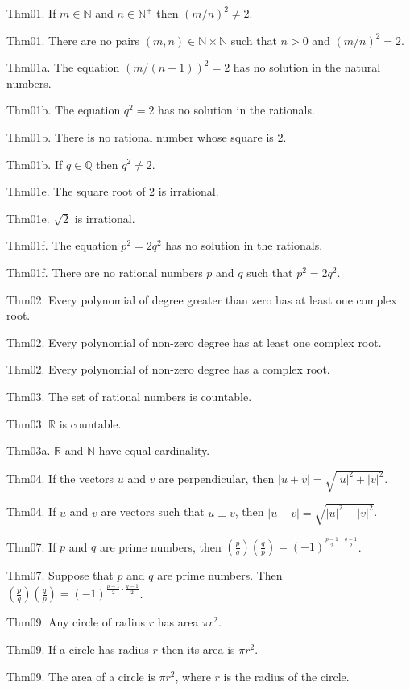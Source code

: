 \documentclass{report}
\begin{document}
Thm01. If $m \in \mathbb{N}$ and $n \in \mathbb{N}^+$ then $(m/n)^2 \neq 2$.

Thm01. There are no pairs $(m, n) \in \mathbb{N}\times\mathbb{N}$ such that $n > 0$ and $(m/n)^2 = 2$.

Thm01a. The equation $(m/(n+1))^2 = 2$ has no solution in the natural numbers.

Thm01b. The equation $q^2 = 2$ has no solution in the rationals.

Thm01b. There is no rational number whose square is $2$.

Thm01b. If $q \in \mathbb{Q}$ then $q^2 \neq 2$.

Thm01e. The square root of $2$ is irrational.

Thm01e. $\sqrt{2}$ is irrational.

Thm01f. The equation $p^2 = 2q^2$ has no solution in the rationals.

Thm01f. There are no rational numbers $p$ and $q$ such that $p^2 = 2q^2$.

Thm02. Every polynomial of degree greater than zero has at least one complex root.

Thm02. Every polynomial of non-zero degree has at least one complex root.

Thm02. Every polynomial of non-zero degree has a complex root.

Thm03. The set of rational numbers is countable.

Thm03. $\mathbb{R}$ is countable.

Thm03a. $\mathbb{R}$ and $\mathbb{N}$ have equal cardinality.

Thm04. If the vectors $u$ and $v$ are perpendicular, then $\lvert u + v \rvert = \sqrt{\lvert u \rvert^2 + \lvert v \rvert^2}$.

Thm04. If $u$ and $v$ are vectors such that $u \perp v$, then $\lvert u + v \rvert = \sqrt{\lvert u \rvert^2 + \lvert v \rvert^2}$.

Thm07. If $p$ and $q$ are prime numbers, then $\left(\frac{p}{q}\right) \left(\frac{q}{p}\right) = (-1)^{\frac{p-1}{2} \cdot \frac{q-1}{2}}$.

Thm07. Suppose that $p$ and $q$ are prime numbers. Then $\left(\frac{p}{q}\right) \left(\frac{q}{p}\right) = (-1)^{\frac{p-1}{2} \cdot \frac{q-1}{2}}$.

Thm09. Any circle of radius $r$ has area $\pi r^2$.

Thm09. If a circle has radius $r$ then its area is $\pi r^2$.

Thm09. The area of a circle is $\pi r^2$, where $r$ is the radius of the circle.
\end{document}
